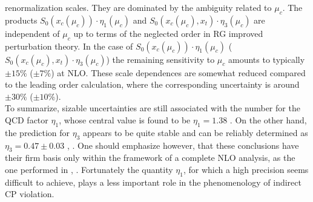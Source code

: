 renormalization scales. They are dominated by the ambiguity related
to $\mu_c$. The products $S_0(x_c(\mu_c))\cdot\eta_1(\mu_c)$ and
$S_0(x_c(\mu_c),x_t)\cdot\eta_3(\mu_c)$ are independent of $\mu_c$
up to terms of the neglected order in RG improved perturbation theory.
In the case of $S_0(x_c(\mu_c))\cdot\eta_1(\mu_c)$
($S_0(x_c(\mu_c),x_t)\cdot\eta_3(\mu_c)$) the remaining sensitivity to
$\mu_c$ amounts to typically $\pm 15\%$ ($\pm 7\%$) at NLO. These
scale dependences are somewhat reduced compared to the leading order
calculation, where the corresponding uncertainty is around $\pm 30\%$
($\pm 10\%$).
\\
To summarize, sizable uncertainties are still associated with the
number for the QCD factor $\eta_1$, whose central value is found to
be $\eta_1=1.38$ \cite{herrlichnierste:93}.
On the other hand, the prediction for $\eta_3$ appears to be quite
stable and can be reliably determined as $\eta_3=0.47\pm 0.03$
\cite{herrlichnierste:95}, \cite{nierste:95}.  One should emphasize
however, that these conclusions have their firm basis only within the
framework of a complete NLO analysis, as the one performed in
\cite{herrlichnierste:93}, \cite{nierste:95}.  Fortunately the quantity
$\eta_1$, for which a high precision seems difficult to achieve, plays
a less important role in the phenomenology of indirect CP violation.

